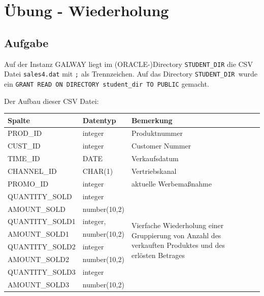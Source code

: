 \section{Übung - Wiederholung}
\label{sec:uebung_12}

\label{subsec:uebung_12.aufgabe_01}
\subsection{Aufgabe}
Auf der Instanz GALWAY liegt im (ORACLE-)Directory \texttt{STUDENT\_DIR} die CSV Datei \texttt{sales4.dat} mit \texttt{;} als Trennzeichen. Auf das Directory \texttt{STUDENT\_DIR }wurde ein \texttt{GRANT READ ON DIRECTORY  student\_dir TO PUBLIC} gemacht.

Der Aufbau dieser CSV Datei:

\begin{table}[H]
  \centering
  \ttfamily
  \begin{tabular}{|l|l|l|l|l|}
    \hline
    \textbf{Spalte} & \textbf{Datentyp} & \textbf{Bemerkung} \\
    \hline
    PROD\_ID        & integer           & Produktnummer \\
    \hline
    CUST\_ID        & integer           & Customer Nummer \\
    \hline
    TIME\_ID        & DATE              & Verkaufsdatum \\
    \hline
    CHANNEL\_ID     & CHAR(1)           & Vertriebskanal \\
    \hline
    PROMO\_ID       & integer           & aktuelle Werbemaßnahme \\
    \hline
    QUANTITY\_SOLD  & integer           & \multirow{8}{*}{\parbox{7.5cm}{Vierfache Wiederholung einer Gruppierung von Anzahl des verkauften Produktes und des erlösten Betrages}}         \\
    AMOUNT\_SOLD    & number(10,2)      & \\
    QUANTITY\_SOLD1 & integer,          & \\
    AMOUNT\_SOLD1   & number(10,2)      & \\
    QUANTITY\_SOLD2 & integer           & \\
    AMOUNT\_SOLD2   & number(10,2)      & \\
    QUANTITY\_SOLD3 & integer           & \\
    AMOUNT\_SOLD3   & number(10,2)      & \\
    \hline
  \end{tabular}
\end{table}

